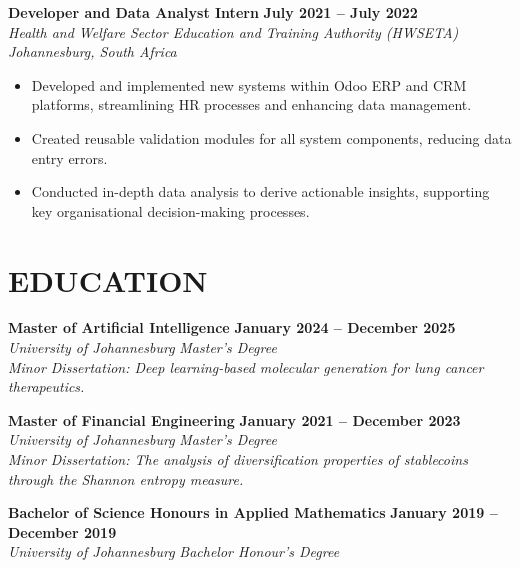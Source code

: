 \documentclass[10pt,a4paper]{article}
\begin{document}
\vspace{0.35em}

\textbf{\color{primary} Developer and Data Analyst Intern} \hfill \textbf{\color{secondary} July 2021 -- July 2022} \\
\textit{Health and Welfare Sector Education and Training Authority (HWSETA)} \hfill \textit{Johannesburg, South Africa}
\begin{itemize}
    \item Developed and implemented new systems within Odoo ERP and CRM platforms, streamlining HR processes and enhancing data management.
    \item Created reusable validation modules for all system components, reducing data entry errors.
    \item Conducted in-depth data analysis to derive actionable insights, supporting key organisational decision-making processes.
\end{itemize}

\pagebreak

\section*{EDUCATION}

\textbf{\color{primary} Master of Artificial Intelligence} \hfill \textbf{\color{secondary} January 2024 -- December 2025} \\
\textit{University of Johannesburg} \hfill \textit{Master's Degree} \\
{\small \textit{Minor Dissertation: Deep learning-based molecular generation for lung cancer therapeutics.}}

\vspace{0.35em}

\textbf{\color{primary} Master of Financial Engineering} \hfill \textbf{\color{secondary} January 2021 -- December 2023} \\
\textit{University of Johannesburg} \hfill \textit{Master's Degree} \\
{\small \textit{Minor Dissertation: The analysis of diversification properties of stablecoins through the Shannon entropy measure.}}

\vspace{0.35em}

\textbf{\color{primary} Bachelor of Science Honours in Applied Mathematics} \hfill \textbf{\color{secondary} January 2019 -- December 2019} \\
\textit{University of Johannesburg} \hfill \textit{Bachelor Honour's Degree}
\end{document}
